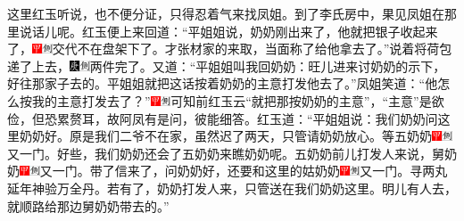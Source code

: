 这里红玉听说，也不便分证，只得忍着气来找凤姐。到了李氏房中，果见凤姐在那里说话儿呢。红玉便上来回道：``平姐姐说，奶奶刚出来了，他就把银子收起来了，{\includegraphics[width=3mm]{../Images/00002}\includegraphics[width=3mm]{../Images/00011}\footnotesize \kaishu 交代不在盘架下了。}才张材家的来取，当面称了给他拿去了。''说着将荷包递了上去，{\includegraphics[width=3mm]{../Images/00004}\includegraphics[width=3mm]{../Images/00011}\footnotesize \kaishu 两件完了。}又道：``平姐姐叫我回奶奶：旺儿进来讨奶奶的示下，好往那家子去的。平姐姐就把这话按着奶奶的主意打发他去了。''凤姐笑道：``他怎么按我的主意打发去了？''{\includegraphics[width=3mm]{../Images/00002}\includegraphics[width=3mm]{../Images/00011}\footnotesize \kaishu 可知前红玉云``就把那按奶奶的主意''，``主意''是欲俭，但恐累赘耳，故阿凤有是问，彼能细答。}红玉道：``平姐姐说：我们奶奶问这里奶奶好。原是我们二爷不在家，虽然迟了两天，只管请奶奶放心。等五奶奶{\includegraphics[width=3mm]{../Images/00002}\includegraphics[width=3mm]{../Images/00011}\footnotesize \kaishu 又一门。}好些，我们奶奶还会了五奶奶来瞧奶奶呢。五奶奶前儿打发人来说，舅奶奶{\includegraphics[width=3mm]{../Images/00002}\includegraphics[width=3mm]{../Images/00011}\footnotesize \kaishu 又一门。}带了信来了，问奶奶好，还要和这里的姑奶奶{\includegraphics[width=3mm]{../Images/00002}\includegraphics[width=3mm]{../Images/00011}\footnotesize \kaishu 又一门。}寻两丸延年神验万全丹。若有了，奶奶打发人来，只管送在我们奶奶这里。明儿有人去，就顺路给那边舅奶奶带去的。''

